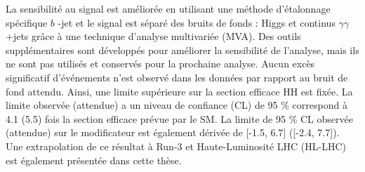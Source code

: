 La sensibilité au signal \HHyybb est améliorée en utilisant une méthode d'étalonnage spécifique $b$ -jet et le signal est séparé des bruits de fonds : Higgs et continus $\gamma\gamma$+jets grâce à une technique d'analyse multivariée (MVA). Des outils supplémentaires sont développés pour améliorer la sensibilité de l'analyse, mais ils ne sont pas utilisés et conservés pour la prochaine analyse. Aucun excès significatif d'événements \HHyybb n'est observé dans les données par rapport au bruit de fond attendu. Ainsi, une limite supérieure sur la section efficace HH est fixée. La limite observée (attendue) a un niveau de confiance (CL) de 95 \% correspond à 4.1 (5.5) fois la section efficace prévue par le SM. La limite de 95 \% CL observée (attendue) sur le modificateur \kl est également dérivée de [-1.5, 6.7] ([-2.4, 7.7]). \\
Une extrapolation de ce résultat à Run-3 et Haute-Luminosité LHC (HL-LHC) est également présentée dans cette thèse.

